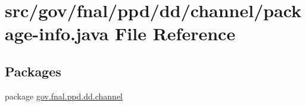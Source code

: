 \hypertarget{gov_2fnal_2ppd_2dd_2channel_2package-info_8java}{\section{src/gov/fnal/ppd/dd/channel/package-\/info.java File Reference}
\label{gov_2fnal_2ppd_2dd_2channel_2package-info_8java}
}
\subsection*{Packages}
\begin{DoxyCompactItemize}
\item 
package \hyperlink{namespacegov_1_1fnal_1_1ppd_1_1dd_1_1channel}{gov.\-fnal.\-ppd.\-dd.\-channel}
\end{DoxyCompactItemize}
